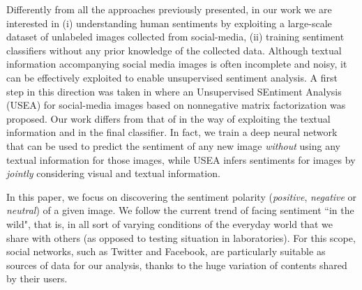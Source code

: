 Differently from all the approaches previously presented, in our work we are interested in (i) understanding human sentiments by exploiting a large-scale dataset of unlabeled images collected from social-media, (ii) training sentiment classifiers without any prior knowledge of the collected data.
Although textual information accompanying social media images is often incomplete and noisy, it can be effectively exploited to enable unsupervised sentiment analysis.
A first step in this direction was taken in \cite{wang2015unsupervised} where an Unsupervised SEntiment Analysis (USEA) for social-media images based on nonnegative matrix factorization was proposed.
Our work differs from that of \citet{wang2015unsupervised} in the way of exploiting the textual information and in the final classifier.
In fact, we train a deep neural network that can be used to predict the sentiment of any new image \emph{without} using any textual information for those images, while USEA infers sentiments for images by \emph{jointly} considering visual and textual information.


In this paper, we focus on discovering the sentiment polarity (\emph{positive}, \emph{negative} or \emph{neutral}) of a given image.
We follow the current trend of facing sentiment ``in the wild", that is, in all sort of varying conditions of the everyday world that we share with others (as opposed to testing situation in laboratories).
For this scope, social networks, such as Twitter and Facebook, are particularly suitable as sources of data for our analysis, thanks to the huge variation of contents shared by their users.

